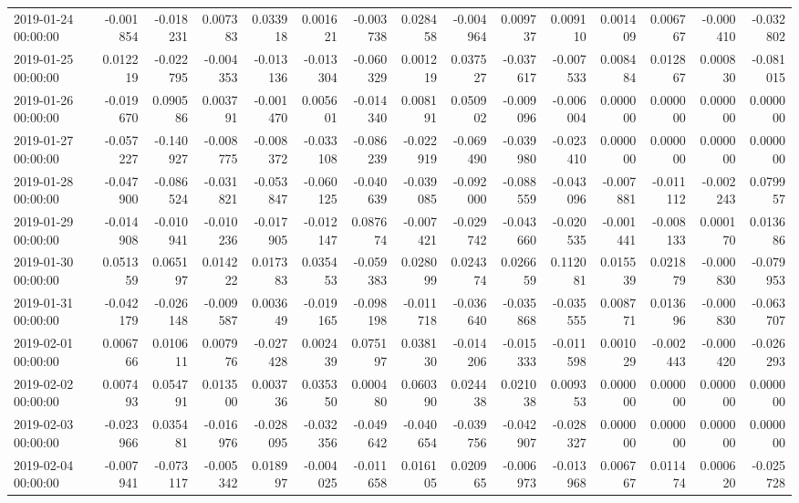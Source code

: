 \begin{tabular}{lrrrrrrrrrrrrrr}
2019-01-24 00:00:00 & -0.001854 & -0.018231 & 0.007383 & 0.033918 & 0.001621 & -0.003738 & 0.028458 & -0.004964 & 0.009737 & 0.009110 & 0.001409 & 0.006767 & -0.000410 & -0.032802 \\
2019-01-25 00:00:00 & 0.012219 & -0.022795 & -0.004353 & -0.013136 & -0.013304 & -0.060329 & 0.001219 & 0.037527 & -0.037617 & -0.007533 & 0.008484 & 0.012867 & 0.000830 & -0.081015 \\
2019-01-26 00:00:00 & -0.019670 & 0.090586 & 0.003791 & -0.001470 & 0.005601 & -0.014340 & 0.008191 & 0.050902 & -0.009096 & -0.006004 & 0.000000 & 0.000000 & 0.000000 & 0.000000 \\
2019-01-27 00:00:00 & -0.057227 & -0.140927 & -0.008775 & -0.008372 & -0.033108 & -0.086239 & -0.022919 & -0.069490 & -0.039980 & -0.023410 & 0.000000 & 0.000000 & 0.000000 & 0.000000 \\
2019-01-28 00:00:00 & -0.047900 & -0.086524 & -0.031821 & -0.053847 & -0.060125 & -0.040639 & -0.039085 & -0.092000 & -0.088559 & -0.043096 & -0.007881 & -0.011112 & -0.002243 & 0.079957 \\
2019-01-29 00:00:00 & -0.014908 & -0.010941 & -0.010236 & -0.017905 & -0.012147 & 0.087674 & -0.007421 & -0.029742 & -0.043660 & -0.020535 & -0.001441 & -0.008133 & 0.000170 & 0.013686 \\
2019-01-30 00:00:00 & 0.051359 & 0.065197 & 0.014222 & 0.017383 & 0.035453 & -0.059383 & 0.028099 & 0.024374 & 0.026659 & 0.112081 & 0.015539 & 0.021879 & -0.000830 & -0.079953 \\
2019-01-31 00:00:00 & -0.042179 & -0.026148 & -0.009587 & 0.003649 & -0.019165 & -0.098198 & -0.011718 & -0.036640 & -0.035868 & -0.035555 & 0.008771 & 0.013696 & -0.000830 & -0.063707 \\
2019-02-01 00:00:00 & 0.006766 & 0.010611 & 0.007976 & -0.027428 & 0.002439 & 0.075197 & 0.038130 & -0.014206 & -0.015333 & -0.011598 & 0.001029 & -0.002443 & -0.000420 & -0.026293 \\
2019-02-02 00:00:00 & 0.007493 & 0.054791 & 0.013500 & 0.003736 & 0.035350 & 0.000480 & 0.060390 & 0.024438 & 0.021038 & 0.009353 & 0.000000 & 0.000000 & 0.000000 & 0.000000 \\
2019-02-03 00:00:00 & -0.023966 & 0.035481 & -0.016976 & -0.028095 & -0.032356 & -0.049642 & -0.040654 & -0.039756 & -0.042907 & -0.028327 & 0.000000 & 0.000000 & 0.000000 & 0.000000 \\
2019-02-04 00:00:00 & -0.007941 & -0.073117 & -0.005342 & 0.018997 & -0.004025 & -0.011658 & 0.016105 & 0.020965 & -0.006973 & -0.013968 & 0.006767 & 0.011474 & 0.000620 & -0.025728 \\

\end{tabular}
